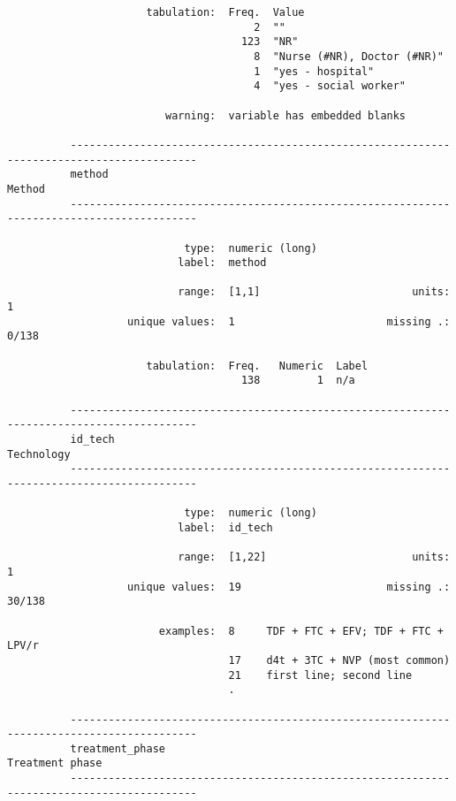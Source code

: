 \documentclass{article}
\begin{document}
\begin{verbatim}
                      tabulation:  Freq.  Value
                                       2  ""
                                     123  "NR"
                                       8  "Nurse (#NR), Doctor (#NR)"
                                       1  "yes - hospital"
                                       4  "yes - social worker"
          
                         warning:  variable has embedded blanks
          
          ------------------------------------------------------------------------------------------
          method                                                                              Method
          ------------------------------------------------------------------------------------------
          
                            type:  numeric (long)
                           label:  method
          
                           range:  [1,1]                        units:  1
                   unique values:  1                        missing .:  0/138
          
                      tabulation:  Freq.   Numeric  Label
                                     138         1  n/a
          
          ------------------------------------------------------------------------------------------
          id_tech                                                                         Technology
          ------------------------------------------------------------------------------------------
          
                            type:  numeric (long)
                           label:  id_tech
          
                           range:  [1,22]                       units:  1
                   unique values:  19                       missing .:  30/138
          
                        examples:  8     TDF + FTC + EFV; TDF + FTC + LPV/r
                                   17    d4t + 3TC + NVP (most common)
                                   21    first line; second line
                                   .     
          
          ------------------------------------------------------------------------------------------
          treatment_phase                                                            Treatment phase
          ------------------------------------------------------------------------------------------
          

\end{verbatim}
\end{document}
